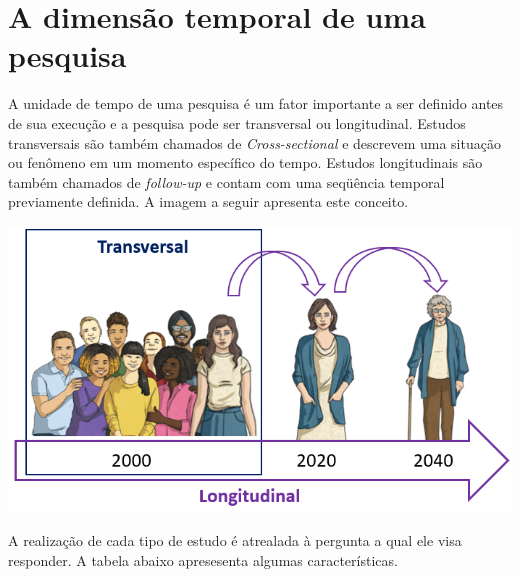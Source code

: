 \documentclass[
]{book}
\begin{document}
\hypertarget{a-dimensuxe3o-temporal-de-uma-pesquisa}{%
\section{A dimensão temporal de uma pesquisa}\label{a-dimensuxe3o-temporal-de-uma-pesquisa}}

A unidade de tempo de uma pesquisa é um fator importante a ser definido antes de sua execução e a pesquisa pode ser transversal ou longitudinal. Estudos transversais são também chamados de \emph{Cross-sectional} e descrevem uma situação ou fenômeno em um momento específico do tempo. Estudos longitudinais são também chamados de \emph{follow-up} e contam com uma seqüência temporal previamente definida. A imagem a seguir apresenta este conceito.

\includegraphics{./img/cap_transversal_longitudinal.png}

A realização de cada tipo de estudo é atrealada à pergunta a qual ele visa responder. A tabela abaixo apresesenta algumas características.
\end{document}
